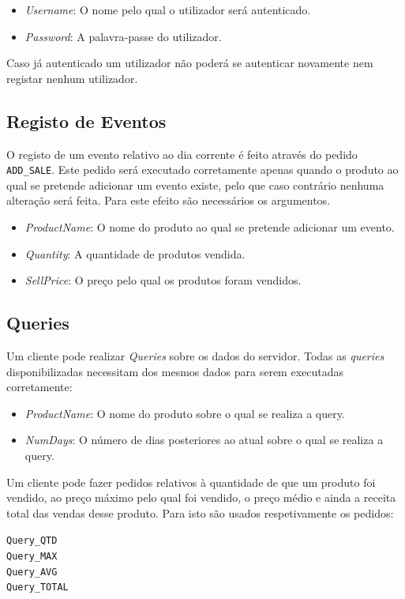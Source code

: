 \documentclass[runningheads]{llncs}
\begin{document}
\begin{itemize}
  \item \emph{Username}: O nome pelo qual o utilizador será autenticado.
  \item \emph{Password}: A palavra-passe do utilizador.
\end{itemize}

Caso já autenticado um utilizador não poderá se autenticar novamente nem registar nenhum utilizador.


\subsection{Registo de Eventos}
O registo de um evento relativo ao dia corrente é feito através do pedido \texttt{ADD\_SALE}.
Este pedido será executado corretamente apenas quando o produto ao qual se pretende adicionar um evento existe, pelo que caso contrário nenhuma alteração será feita. Para este efeito são necessários os argumentos.

\begin{itemize}
  \item \emph{ProductName}: O nome do produto ao qual se pretende adicionar um evento.
  \item \emph{Quantity}: A quantidade de produtos vendida.
  \item \emph{SellPrice}: O preço pelo qual os produtos foram vendidos.
\end{itemize}

\subsection{Queries}
Um cliente pode realizar \emph{Queries} sobre os dados do servidor.
Todas as \emph{queries} disponibilizadas necessitam dos mesmos dados para serem executadas corretamente:
\begin{itemize}
  \item \emph{ProductName}: O nome do produto sobre o qual se realiza a query.
  \item \emph{NumDays}: O número de dias posteriores ao atual sobre o qual se realiza a query.
\end{itemize}

\noindent Um cliente pode fazer pedidos relativos à quantidade de que um produto foi vendido, ao preço máximo pelo qual foi vendido, o preço médio e ainda a receita total das vendas desse produto.
Para isto são usados respetivamente os pedidos:

\noindent \texttt{Query\_QTD}
\\\texttt{Query\_MAX}
\\\texttt{Query\_AVG}
\\\texttt{Query\_TOTAL}
\end{document}
